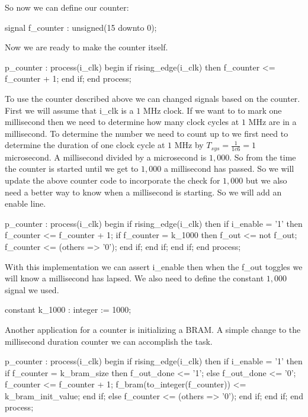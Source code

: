 So now we can define our counter:

\begin{VHDLlisting}[tabsize=4]
signal f_counter : unsigned(15 downto 0);
\end{VHDLlisting}

Now we are ready to make the counter itself.

\begin{VHDLlisting}[tabsize=4]
p_counter : process(i_clk) 
begin
    if rising_edge(i_clk) then
        f_counter <= f_counter + 1;
    end if;
end process;
\end{VHDLlisting}

To use the counter described above we can changed signals based on the counter. First we will assume that i\_clk is a $1$ \ac{MHz} clock. If we want to to mark one millisecond then we need to determine how many clock cycles at $1$ \ac{MHz} are in a millisecond. To determine the number we need to count up to we first need to determine the duration of one clock cycle at $1$ \ac{MHz} by $T_{sys}=\frac{1}{1e6}=1$ microsecond. A millisecond divided by a microsecond is $1,000$. So from the time the counter is started until we get to $1,000$ a millisecond has passed. So we will update the above counter code to incorporate the check for $1,000$ but we also need a better way to know when a millisecond is starting. So we will add an enable line.

\begin{VHDLlisting}[tabsize=4]
p_counter : process(i_clk) 
begin
    if rising_edge(i_clk) then
        if i_enable = '1' then
            f_counter <= f_counter + 1;
            if f_counter = k_1000 then
                f_out <= not f_out;
                f_counter <= (others => '0');
            end if;
        end if;
    end if;
end process;
\end{VHDLlisting}

With this implementation we can assert i\_enable then when the f\_out toggles we will know a millisecond has lapsed. We also need to define the constant $1,000$ signal we used. 

\begin{VHDLlisting}[tabsize=4]
constant k_1000 : integer := 1000;
\end{VHDLlisting}

Another application for a counter is initializing a \ac{BRAM}. A simple change to the millisecond duration counter we can accomplish the task.

\begin{VHDLlisting}[tabsize=4]
p_counter : process(i_clk) 
begin
    if rising_edge(i_clk) then
        if i_enable = '1' then
            if f_counter = k_bram_size then
                f_out_done <= '1';
            else
                f_out_done <= '0';
                f_counter <= f_counter + 1;
                f_bram(to_integer(f_counter)) <= k_bram_init_value;
            end if;
        else	
            f_counter <= (others => '0');
        end if;
    end if;
end process;
\end{VHDLlisting}


